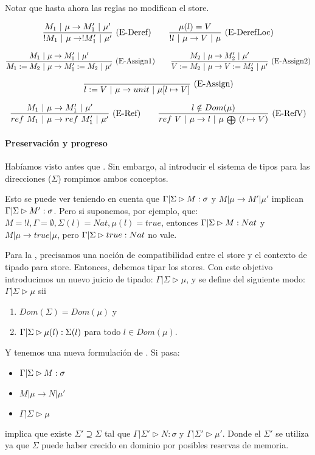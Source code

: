 Notar que hasta ahora las reglas no modifican el store.

\[\frac{M_1 \ |\  \mu \to M_1' \ |\  \mu'}{!M_1 \ |\  \mu \to !M_1' \ |\  \mu'}\ \text{(E-Deref)}\quad\quad \frac{\mu(l) = V}{!l \ |\  \mu \to V \ |\  \mu}\ \text{(E-DerefLoc)}\]

\[\frac{M_1 \ |\  \mu \to M_1' \ |\  \mu'}{M_1 := M_2 \ |\  \mu \to M_1' := M_2 \ |\  \mu'}\ \text{(E-Assign1)}\quad\quad \frac{M_2 \ |\  \mu \to M_2' \ |\  \mu'}{V := M_2 \ |\  \mu \to V := M_2' \ |\  \mu'}\ \text{(E-Assign2)}\]

\[\frac{}{l := V \ |\  \mu \to unit \ |\  \mu[l \mapsto V]}\ \text{(E-Assign)}\]

\[\deriv{M_1 \vert \mu \to M_1' \vert \mu'}{ref\ M_1 \vert \mu \to ref\ M_1' \vert \mu'}{E-Ref}\quad\quad \deriv{l \notin Dom(\mu)}{ref\ V \vert \mu \to l \vert \mu\ {\scriptstyle \medoplus}\ (l \mapsto V)}{E-RefV}\]

\paragraph{Preservación y progreso}

Habíamos visto antes que . Sin embargo, al introducir el sistema de tipos para las direcciones ($\Sigma$) rompimos ambos conceptos.

Esto se puede ver teniendo en cuenta que $\Gamma|\Sigma \rhd M : \sigma$ y $M \vert \mu \to M' \vert \mu'$ implican $\Gamma|\Sigma \rhd M' : \sigma$. Pero si suponemos, por ejemplo, que: $M = !l, \Gamma = \emptyset, \Sigma(l) = Nat, \mu(l) = true$, entonces $\Gamma|\Sigma \rhd M : Nat$ y $M \vert \mu \to true \vert \mu$, pero $\Gamma|\Sigma \rhd true : Nat$ no vale.

Para la , precisamos una noción de compatibilidad entre el store y el contexto de tipado para store. Entonces, debemos tipar los stores. Con este objetivo introducimos un nuevo juicio de tipado: $\Gamma|\Sigma \rhd \mu$, y se define del siguiente modo: $\Gamma|\Sigma \rhd \mu$ sii
\begin{enumerate}
  \item $Dom(\Sigma) = Dom(\mu)$ y
  \item $\Gamma|\Sigma \rhd \mu(l) : \Sigma(l)$ para todo $l \in Dom(\mu)$.
\end{enumerate}

Y tenemos una nueva formulación de . Si pasa:
\begin{itemize}
  \item $\Gamma|\Sigma \rhd M : \sigma$
  \item $M \vert \mu \to N \vert \mu'$
  \item $\Gamma|\Sigma \rhd \mu$
\end{itemize}
implica que existe $\Sigma' \supseteq \Sigma$ tal que $\Gamma|\Sigma' \rhd N : \sigma$ y $\Gamma|\Sigma' \rhd \mu'$. Donde el $\Sigma'$ se utiliza ya que $\Sigma$ puede haber crecido en dominio por posibles reservas de memoria.

